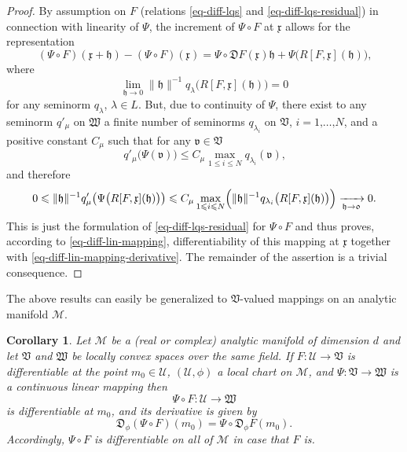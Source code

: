 \documentclass[11pt,twoside,openright]{report}
\theoremstyle{definition}
\theoremstyle{plain}
\newtheorem{Cor}[Def]{Corollary}
\theoremstyle{remark}
\theoremstyle{assumption}
\newcommand{\norm}[1]{\lVert #1 \rVert}
\newcommand{\ql}{q_\lambda}
\newcommand{\bqlx}[1]{q_\lambda \bigl( #1 \bigr)}
\newcommand{\qprim}{q'_\mu}
\newcommand{\bqprimx}[1]{q'_\mu \bigl( #1 \bigr)}
\newcommand{\zerofrak}{\mathfrak{0}}
\newcommand{\Dfrak}{\mathfrak{D}}
\newcommand{\Vfrak}{\mathfrak{V}}
\newcommand{\Wfrak}{\mathfrak{W}}
\newcommand{\hfrak}{\mathfrak{h}}
\newcommand{\vfrak}{\mathfrak{v}}
\newcommand{\xfrak}{\mathfrak{x}}
\newcommand{\Mscr}{\mathscr{M}}
\newcommand{\Uscr}{\mathscr{U}}
\begin{document}
\begin{proof}
  By assumption on $F$ (relations \eqref{eq-diff-lqs} and
  \eqref{eq-diff-lqs-residual}) in connection with linearity of
  $\Psi$, the increment of $\Psi \circ F$ at $\xfrak$ allows for the
  representation
  \begin{equation}
    \label{eq-diff-lin-mapping}
    ( \Psi \circ F ) ( \xfrak + \hfrak ) - ( \Psi \circ F ) ( \xfrak )
    = \Psi \circ \Dfrak F ( \xfrak ) \hfrak + \Psi \bigl( R [ F ,
    \xfrak] ( \hfrak ) \bigr) \text{,}
  \end{equation}
  where
  \begin{equation*}
    \lim_{\hfrak \rightarrow \zerofrak} \norm{\hfrak}^{-1} \bqlx{R [ F
    , \xfrak ] ( \hfrak )} = 0
  \end{equation*}
  for any seminorm $\ql$, $\lambda \in L$. But, due to continuity of
  $\Psi$, there exist to any seminorm $\qprim$ on $\Wfrak$ a finite
  number of seminorms $q_{\lambda_i}$ on $\Vfrak$, $i = 1 \text{,}
  \dots \text{,} N$, and a positive constant $C_\mu$ such that
  for any $\vfrak \in \Vfrak$
  \begin{equation*}
    \bqprimx{\Psi ( \vfrak )} \leqslant C_\mu \max_{1 \leqslant i
    \leqslant N} q_{\lambda_i} ( \vfrak ) \text{,}
  \end{equation*}
  and therefore
  \begin{equation*}
    0 \leqslant \norm{\hfrak}^{-1} \bqprimx{\Psi \bigl( R [ F ,
    \xfrak] ( \hfrak ) \bigr)} \leqslant C_\mu \max_{1 \leqslant i
    \leqslant N} \Bigl( \norm{\hfrak}^{-1} q_{\lambda_i} \bigl( R [ F
    , \xfrak] ( \hfrak ) \bigr) \Bigr) \xrightarrow[\hfrak \rightarrow
    \zerofrak]{} 0 \text{.}
  \end{equation*}
  This is just the formulation of \eqref{eq-diff-lqs-residual} for
  $\Psi \circ F$ and thus proves, according to
  \eqref{eq-diff-lin-mapping}, differentiability of this mapping at
  $\xfrak$ together with \eqref{eq-diff-lin-mapping-derivative}. The
  remainder of the assertion is a trivial consequence.
\end{proof}
The above results can easily be generalized to $\Vfrak$-valued
mappings on an analytic manifold $\Mscr$.
\begin{Cor}
  \label{Cor-differentiable-M-lin-mappings}
  Let $\Mscr$ be a (real or complex) analytic manifold of dimension
  $d$ and let $\Vfrak$ and $\Wfrak$ be locally convex spaces over the
  same field. If $F : \Uscr \rightarrow \Vfrak$ is differentiable at
  the point $m_0 \in \Uscr$, $( \Uscr , \phi )$ a local chart on
  $\Mscr$, and $\Psi : \Vfrak \rightarrow \Wfrak$ is a continuous
  linear mapping then
  \begin{equation*}
    \Psi \circ F : \Uscr \rightarrow \Wfrak
  \end{equation*}
  is differentiable at $m_0$, and its derivative is given by
  \begin{equation}
    \label{eq-diff-lin-mapping-M-derivative}
    \Dfrak_\phi ( \Psi \circ F ) ( m_0 ) = \Psi \circ \Dfrak_\phi F (
    m_0 ) \text{.}
  \end{equation}
  Accordingly, $\Psi \circ F$ is differentiable on all of $\Mscr$ in
  case that $F$ is. 
\end{Cor}
\end{document}
